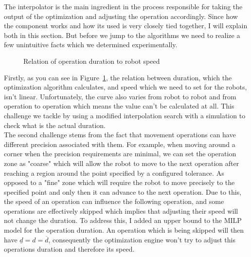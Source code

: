 
The interpolator is the main ingredient in the process responsible for taking the output of the optimization and adjusting the operation accordingly. Since how the component works and how its used is very closely tied together, I will explain both in this section. But before we jump to the algorithms we need to realize a few unintuitive facts which we determined experimentally. \\

\begin{figure}[H]
	\caption{Relation of operation duration to robot speed}
	\centering
	
	\label{fig:SpeedVsDuration}
\end{figure}

Firstly, as you can see in Figure~\ref{fig:SpeedVsDuration}, the relation between duration, which the optimization algorithm calculates, and speed which we need to set for the robots, isn't linear. Unfortunately, the curve also varies from robot to robot and from operation to operation which means the value can't be calculated at all. This challenge we tackle by using a modified interpolation search with a simulation to check what is the actual duration. \\

The second challenge stems from the fact that movement operations can have different precision associated with them. For example, when moving around a corner when the precision requirements are minimal, we can set the operation zone as "coarse" which will allow the robot to move to the next operation after reaching a region around the point specified by a configured tolerance. As opposed to a "fine" zone which will require the robot to move precisely to the specified point and only then it can advance to the next operation. Due to this, the speed of an operation can influence the following operation, and some operations are effectively skipped which implies that adjusting their speed will not change the duration. To address this, I added an upper bound to the MILP model for the operation duration. An operation which is being skipped will then have $\underline{d} = d = \overline{d}$, consequently the optimization engine won't try to adjust this operations duration and therefore its speed. \\

